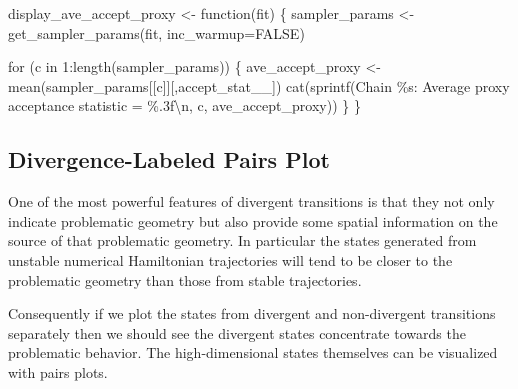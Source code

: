 \documentclass[
  letterpaper,
  DIV=11,
  numbers=noendperiod]{scrartcl}
\newenvironment{Shaded}{\begin{snugshade}}{\end{snugshade}}
\newcommand{\AttributeTok}[1]{\textcolor[rgb]{0.40,0.45,0.13}{#1}}
\newcommand{\ConstantTok}[1]{\textcolor[rgb]{0.56,0.35,0.01}{#1}}
\newcommand{\ControlFlowTok}[1]{\textcolor[rgb]{0.00,0.23,0.31}{#1}}
\newcommand{\DecValTok}[1]{\textcolor[rgb]{0.68,0.00,0.00}{#1}}
\newcommand{\FunctionTok}[1]{\textcolor[rgb]{0.28,0.35,0.67}{#1}}
\newcommand{\NormalTok}[1]{\textcolor[rgb]{0.00,0.23,0.31}{#1}}
\newcommand{\OtherTok}[1]{\textcolor[rgb]{0.00,0.23,0.31}{#1}}
\newcommand{\SpecialCharTok}[1]{\textcolor[rgb]{0.37,0.37,0.37}{#1}}
\newcommand{\StringTok}[1]{\textcolor[rgb]{0.13,0.47,0.30}{#1}}
\begin{document}
\begin{Shaded}
\begin{Highlighting}[]
\NormalTok{display\_ave\_accept\_proxy }\OtherTok{\textless{}{-}} \ControlFlowTok{function}\NormalTok{(fit) \{}
\NormalTok{  sampler\_params }\OtherTok{\textless{}{-}} \FunctionTok{get\_sampler\_params}\NormalTok{(fit, }\AttributeTok{inc\_warmup=}\ConstantTok{FALSE}\NormalTok{)}

  \ControlFlowTok{for}\NormalTok{ (c }\ControlFlowTok{in} \DecValTok{1}\SpecialCharTok{:}\FunctionTok{length}\NormalTok{(sampler\_params)) \{}
\NormalTok{    ave\_accept\_proxy }\OtherTok{\textless{}{-}} \FunctionTok{mean}\NormalTok{(sampler\_params[[c]][,}\StringTok{\textquotesingle{}accept\_stat\_\_\textquotesingle{}}\NormalTok{])}
    \FunctionTok{cat}\NormalTok{(}\FunctionTok{sprintf}\NormalTok{(}\StringTok{\textquotesingle{}Chain \%s: Average proxy acceptance statistic = \%.3f}\SpecialCharTok{\textbackslash{}n}\StringTok{\textquotesingle{}}\NormalTok{,}
\NormalTok{                c, ave\_accept\_proxy))}
\NormalTok{  \}}
\NormalTok{\}}
\end{Highlighting}
\end{Shaded}

\hypertarget{divergence-labeled-pairs-plot}{%
\subsection{Divergence-Labeled Pairs
Plot}\label{divergence-labeled-pairs-plot}}

One of the most powerful features of divergent transitions is that they
not only indicate problematic geometry but also provide some spatial
information on the source of that problematic geometry. In particular
the states generated from unstable numerical Hamiltonian trajectories
will tend to be closer to the problematic geometry than those from
stable trajectories.

Consequently if we plot the states from divergent and non-divergent
transitions separately then we should see the divergent states
concentrate towards the problematic behavior. The high-dimensional
states themselves can be visualized with pairs plots.
\end{document}
